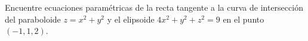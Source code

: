 \item Encuentre ecuaciones paramétricas de la recta tangente a la curva de intersección del paraboloide $z = x^2 + y^2$ y el elipsoide $4x^2 + y^2 + z^2 = 9$ en el punto $(-1, 1, 2)$.
